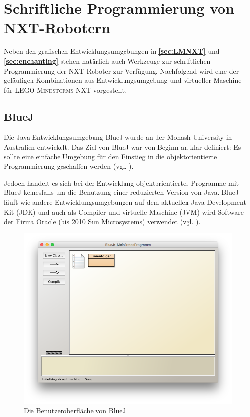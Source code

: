 \documentclass[paper=a4, DIV=calc, BCOR=15mm, twoside=on, onecolumn=on, open = right, titlepage =on, parskip =half, headsepline = on, footsepline = on, chapterprefix = off, appendixprefix = off, fontsize = 12pt, numbers = noenddot, abstract = on]{scrbook}
\begin{document}
\newpage

\section{Schriftliche Programmierung von NXT-Robotern}
\label{sec:bluejetc}
Neben den grafischen Entwicklungsumgebungen in \textbf{\ref{sec:LMNXT}} und \textbf{\ref{sec:enchanting}} stehen natürlich auch Werkzeuge zur schriftlichen Programmierung der NXT-Roboter zur Verfügung. Nachfolgend wird eine der geläufigen Kombinationen aus Entwicklungsumgebung und virtueller Maschine für \textsc{LEGO Mindstorms} NXT vorgestellt. 

\subsection{BlueJ}
\label{sec:bluej}
Die Java-Entwicklungsumgebung BlueJ wurde an der Monash University in Australien entwickelt. Das Ziel von BlueJ war von Beginn an klar definiert: Es sollte eine einfache Umgebung für den Einstieg in die objektorientierte Programmierung geschaffen werden (vgl. \cite[S.14]{barnes:03}).

Jedoch handelt es sich bei der Entwicklung objektorientierter Programme mit BlueJ keinesfalls um die Benutzung einer reduzierten Version von Java. BlueJ läuft wie andere Entwicklungsumgebungen auf dem aktuellen Java Development Kit (JDK) und auch als Compiler und virtuelle Maschine (JVM) wird Software der Firma Oracle (bis 2010 Sun Microsystems) verwendet (vgl. \cite[S.15]{barnes:03}).

\begin{figure}[htbp]
\centering
\includegraphics[scale=0.4]{images/firstprogram.png}
\caption{Die Benutzeroberfläche von BlueJ}
\label{fig:BlueJ UI}
\end{figure}
\end{document}
